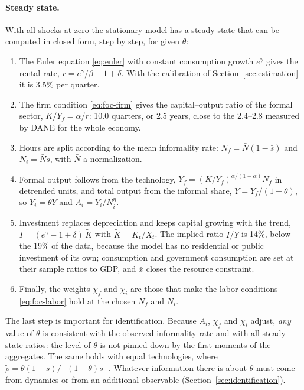 \paragraph{Steady state.} With all shocks at zero the stationary model has a steady state that can be computed in closed form, step by step, for given $\theta$:
\begin{enumerate}[leftmargin=*]
  \item The Euler equation \eqref{eq:euler} with constant consumption growth $e^{\gamma}$ gives the rental rate, $r = e^{\gamma}/\beta - 1 + \delta$. With the calibration of Section~\ref{sec:estimation} it is 3.5\% per quarter.
  \item The firm condition \eqref{eq:foc-firm} gives the capital--output ratio of the formal sector, $K/Y_f = \alpha/r$: 10.0 quarters, or 2.5 years, close to the 2.4--2.8 measured by DANE for the whole economy.
  \item Hours are split according to the mean informality rate: $N_f = \bar N(1-\bar s)$ and $N_i=\bar N\bar s$, with $\bar N$ a normalization.
  \item Formal output follows from the technology, $Y_f = (K/Y_f)^{\alpha/(1-\alpha)}N_f$ in detrended units, and total output from the informal share, $Y = Y_f/(1-\theta)$, so $Y_i=\theta Y$ and $A_i = Y_i/N_i^{\eta}$.
  \item Investment replaces depreciation and keeps capital growing with the trend, $I = (e^{\gamma}-1+\delta)\,\tilde K$ with $\tilde K = K_t/X_t$. The implied ratio $I/Y$ is 14\%, below the 19\% of the data, because the model has no residential or public investment of its own; consumption and government consumption are set at their sample ratios to GDP, and $\bar x$ closes the resource constraint.
  \item Finally, the weights $\chi_f$ and $\chi_i$ are those that make the labor conditions \eqref{eq:foc-labor} hold at the chosen $N_f$ and $N_i$.
\end{enumerate}
The last step is important for identification. Because $A_i$, $\chi_f$ and $\chi_i$ adjust, \emph{any} value of $\theta$ is consistent with the observed informality rate and with all steady-state ratios: the level of $\theta$ is not pinned down by the first moments of the aggregates. The same holds with equal technologies, where $\tilde\rho=\theta(1-\bar s)/[(1-\theta)\bar s]$. Whatever information there is about $\theta$ must come from dynamics or from an additional observable (Section~\ref{sec:identification}).

